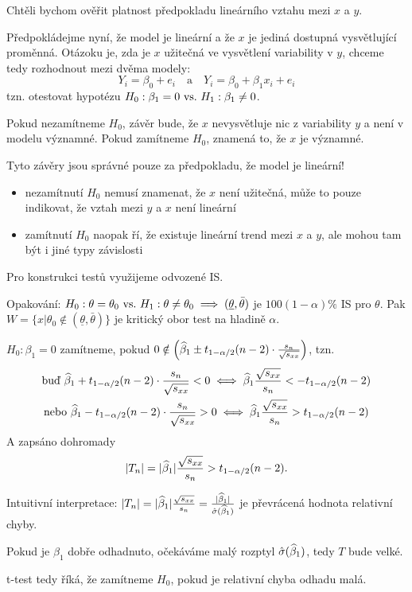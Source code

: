 Chtěli bychom ověřit platnost předpokladu lineárního vztahu mezi $x$ a $y$.

Předpokládejme nyní, že model je lineární a že $x$ je jediná dostupná vysvětlující proměnná. Otázoku je, zda je $x$ užitečná ve vysvětlení variability v $y$, chceme tedy rozhodnout mezi dvěma modely:
\begin{equation*}
	Y_i = \beta_0 + e_i \quad \text{a} \quad Y_i = \beta_0 + \beta_1 x_i + e_i
\end{equation*}
tzn. otestovat hypotézu $H_0: \beta_1 = 0 ~\text{vs.}~ H_1: \beta_1 \neq 0$.

Pokud nezamítneme $H_0$, závěr bude, že $x$ nevysvětluje nic z variability $y$ a není v modelu významné. Pokud zamítneme $H_0$, znamená to, že $x$ je významné.

\begin{remark}
	Tyto závěry jsou správné pouze za předpokladu, že model je lineární!
	\begin{itemize}
		\item nezamítnutí $H_0$ nemusí znamenat, že $x$ není užitečná, může to pouze indikovat, že vztah mezi $y$ a $x$ není lineární
		\item zamítnutí $H_0$ naopak ří, že existuje lineární trend mezi $x$ a $y$, ale mohou tam být i jiné typy závislosti
	\end{itemize}
\end{remark}

Pro konstrukci testů využijeme odvozené IS.

\begin{remark}
	Opakování: $H_0: \theta = \theta_0 ~\text{vs.}~ H_1: \theta \neq \theta_0 \implies (\underline{\theta}, \bar{\theta})$ je $100(1-\alpha)\%$ IS pro $\theta$. Pak $W = \{ x | \theta_0 \notin (\underline{\theta}, \bar{\theta}) \}$ je kritický obor test na hladině $\alpha$.
\end{remark}

$H_0: \beta_1 = 0$ zamítneme, pokud $0 \notin \left( \widehat{\beta}_1 \pm t_{1-\alpha/2}(n-2) \cdot  \frac{s_n}{\sqrt{s_{xx}}} \right)$, tzn.
\begin{gather*}
	\text{buď } \widehat{\beta}_1 + t_{1-\alpha/2}(n-2) \cdot  \frac{s_n}{\sqrt{s_{xx}}} < 0 \iff  \widehat{\beta}_1 \frac{\sqrt{s_{xx}}}{s_n} < - t_{1-\alpha/2}(n-2) \\
	\text{nebo } \widehat{\beta}_1 - t_{1-\alpha/2}(n-2) \cdot  \frac{s_n}{\sqrt{s_{xx}}} > 0 \iff \widehat{\beta}_1 \frac{\sqrt{s_{xx}}}{s_n} > t_{1-\alpha/2}(n-2)
\end{gather*}
A zapsáno dohromady
\begin{equation*}
	|T_n| = |\widehat{\beta}_1| \frac{\sqrt{s_{xx}}}{s_n} > t_{1-\alpha/2}(n-2).
\end{equation*}

\begin{remark}
	Intuitivní interpretace: $|T_n| = |\widehat{\beta}_1| \frac{\sqrt{s_{xx}}}{s_n} = \frac{|\widehat{\beta}_1|}{\hat{\sigma}(\widehat{\beta}_1)}$ je převrácená hodnota relativní chyby.
	
	Pokud je $\beta_1$ dobře odhadnuto, očekáváme malý rozptyl $\hat{\sigma}(\widehat{\beta}_1)$, tedy $T$ bude velké.
	
	t-test tedy říká, že zamítneme $H_0$, pokud je relativní chyba odhadu malá.
\end{remark}